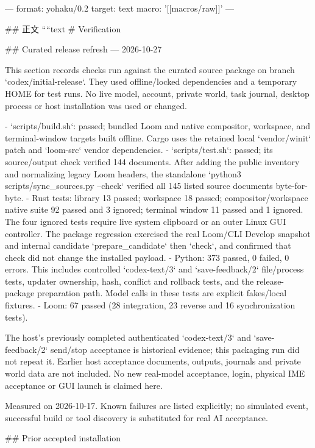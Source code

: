 ---
format: yohaku/0.2
target: text
macro: '[[macros/raw]]'
---

## 正文
````text
# Verification

## Curated release refresh — 2026-10-27

This section records checks run against the curated source package on branch
`codex/initial-release`. They used offline/locked dependencies and a temporary
HOME for test runs. No live model, account, private world, task journal, desktop
process or host installation was used or changed.

- `scripts/build.sh`: passed; bundled Loom and native compositor, workspace,
  and terminal-window targets built offline. Cargo uses the retained local
  `vendor/winit` patch and `loom-src` vendor dependencies.
- `scripts/test.sh`: passed; its source/output check verified 144 documents.
  After adding the public inventory and normalizing legacy Loom headers, the
  standalone `python3 scripts/sync_sources.py --check` verified all 145 listed
  source documents byte-for-byte.
- Rust tests: library 13 passed; workspace 18 passed; compositor/workspace
  native suite 92 passed and 3 ignored; terminal window 11 passed and 1
  ignored. The four ignored tests require live system clipboard or an outer
  Linux GUI controller. The package regression exercised the real Loom/CLI
  Develop snapshot and internal candidate `prepare_candidate` then `check`,
  and confirmed that check did not change the installed payload.
- Python: 373 passed, 0 failed, 0 errors. This includes controlled
  `codex-text/3` and `save-feedback/2` file/process tests, updater ownership,
  hash, conflict and rollback tests, and the release-package preparation path.
  Model calls in these tests are explicit fakes/local fixtures.
- Loom: 67 passed (28 integration, 23 reverse and 16 synchronization tests).

The host's previously completed authenticated `codex-text/3` and
`save-feedback/2` send/stop acceptance is historical evidence; this packaging
run did not repeat it. Earlier host acceptance documents, outputs, journals and
private world data are not included. No new real-model acceptance, login,
physical IME acceptance or GUI launch is claimed here.

Measured on 2026-10-17. Known failures are listed explicitly; no simulated
event, successful build or tool discovery is substituted for real AI acceptance.

## Prior accepted installation

